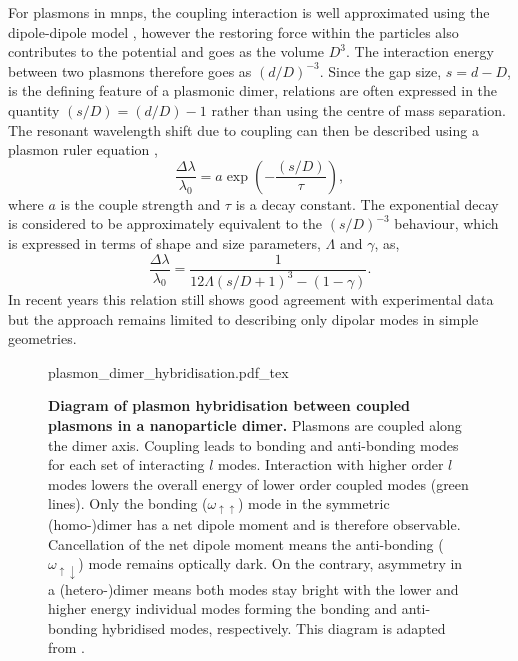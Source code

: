 \documentclass{article}
\begin{document}
For plasmons in \glspl{mnp}, the coupling interaction is well approximated using the dipole-dipole model \cite{kreibig1995optical, maier2002, gluodenis2002, rechberger2003}, however the restoring force within the particles also contributes to the potential and goes as the volume $D^3$. The interaction energy between two plasmons therefore goes as $(d/D)^{-3}$. Since the gap size, $s=d-D$, is the defining feature of a plasmonic dimer, relations are often expressed in the quantity $(s/D) = (d/D)-1$ rather than using the centre of mass separation. The resonant wavelength shift due to coupling can then be described using a plasmon ruler equation \cite{jain2007, ben2011},
\begin{equation}
\frac{\Delta\lambda}{\lambda_0} = a\exp\left(-\frac{(s/D)}{\tau}\right),
\label{eq:plasmon_ruler}
\end{equation}
where $a$ is the couple strength and $\tau$ is a decay constant. The exponential decay is considered to be approximately equivalent to the $(s/D)^{-3}$ behaviour, which is expressed in terms of shape and size parameters, $\Lambda$ and $\gamma$, as,
\begin{equation}
\frac{\Delta\lambda}{\lambda_0} = \frac{1}{12\Lambda(s/D+1)^3 - (1-\gamma)}.
\end{equation}
In recent years this relation still shows good agreement with experimental data \cite{} but the approach remains limited to describing only dipolar modes in simple geometries.

\begin{figure}[bt]
\centering
\fontsize{10pt}{1em}\selectfont
\def\svgwidth{0.98\textwidth}
{plasmon_dimer_hybridisation.pdf_tex}
\caption[Diagram of plasmon hybridisation between coupled plasmons in a nanoparticle dimer]{\textbf{Diagram of plasmon hybridisation between coupled plasmons in a nanoparticle dimer.} Plasmons are coupled along the dimer axis. Coupling leads to bonding and anti-bonding modes for each set of interacting $l$ modes. Interaction with higher order $l$ modes lowers the overall energy of lower order coupled modes (green lines). Only the bonding ($\omega_{\uparrow\uparrow}$) mode in the symmetric (homo-)dimer has a net dipole moment and is therefore observable. Cancellation of the net dipole moment means the anti-bonding ($\omega_{\uparrow\downarrow}$) mode remains optically dark. On the contrary, asymmetry in a (hetero-)dimer means both modes stay bright with the lower and higher energy individual modes forming the bonding and anti-bonding hybridised modes, respectively. This diagram is adapted from \cite{nordlander2004}.}
\label{fig:plasmon_hybridisation}
\end{figure}
\end{document}
